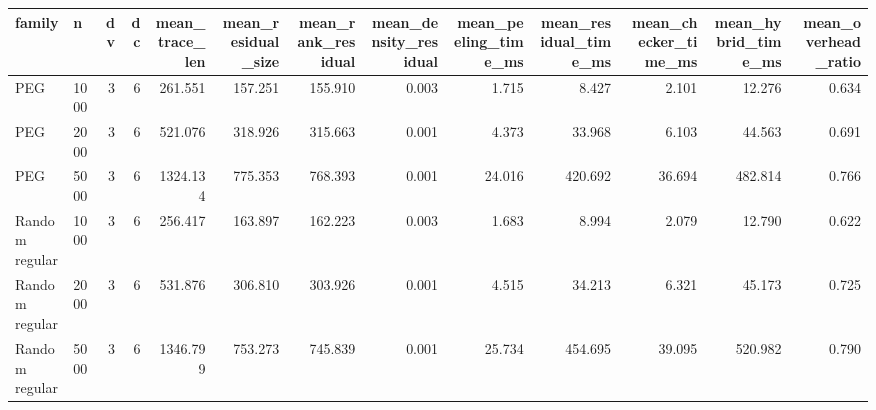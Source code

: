 \begin{tabular}{llrrrrrrrrrrr}
\toprule
family & n & dv & dc & mean_trace_len & mean_residual_size & mean_rank_residual & mean_density_residual & mean_peeling_time_ms & mean_residual_time_ms & mean_checker_time_ms & mean_hybrid_time_ms & mean_overhead_ratio \\
\midrule
PEG & 1000 & 3 & 6 & 261.551 & 157.251 & 155.910 & 0.003 & 1.715 & 8.427 & 2.101 & 12.276 & 0.634 \\
PEG & 2000 & 3 & 6 & 521.076 & 318.926 & 315.663 & 0.001 & 4.373 & 33.968 & 6.103 & 44.563 & 0.691 \\
PEG & 5000 & 3 & 6 & 1324.134 & 775.353 & 768.393 & 0.001 & 24.016 & 420.692 & 36.694 & 482.814 & 0.766 \\
Random regular & 1000 & 3 & 6 & 256.417 & 163.897 & 162.223 & 0.003 & 1.683 & 8.994 & 2.079 & 12.790 & 0.622 \\
Random regular & 2000 & 3 & 6 & 531.876 & 306.810 & 303.926 & 0.001 & 4.515 & 34.213 & 6.321 & 45.173 & 0.725 \\
Random regular & 5000 & 3 & 6 & 1346.799 & 753.273 & 745.839 & 0.001 & 25.734 & 454.695 & 39.095 & 520.982 & 0.790 \\
\bottomrule
\end{tabular}
